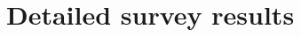 \documentclass[11pt, oneside]{amsart}
\begin{document}
{\scriptsize
\begin{longtable}{lll}

\end{longtable}
}

\section{Detailed survey results}  \label{sec:survey_details}



%

\newpage



\end{document}
